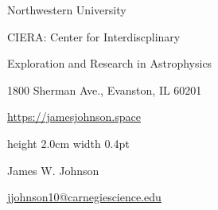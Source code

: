 \documentclass[cv.tex]{subfiles}
\begin{document}
\begin{center}
\parbox{.44\textwidth}{%
	\raggedleft%
	\vspace{-1.5cm}%
	Northwestern University \par
	CIERA: Center for Interdiscplinary \par
	Exploration and Research in Astrophysics \par
	1800 Sherman Ave., Evanston, IL 60201 \par
	\url{https://jamesjohnson.space}%
}%
\hspace{4mm}%
\vrule height 2.0cm width 0.4pt%
\hspace{4mm}%
\parbox{.5\textwidth}{%
	{%
	\vspace{-1.5cm}%
	\fontsize{30}{36} \selectfont James W. Johnson \par
	\fontsize{20}{25} \selectfont {} \par
	\fontsize{11}{13} \selectfont%
	\vspace{0.08cm}%
	\href{mailto:jjohnson10@carnegiescience.edu}{jjohnson10@carnegiescience.edu}%
	\hspace{3mm}%
	}%
}%
\end{center}
\end{document}

